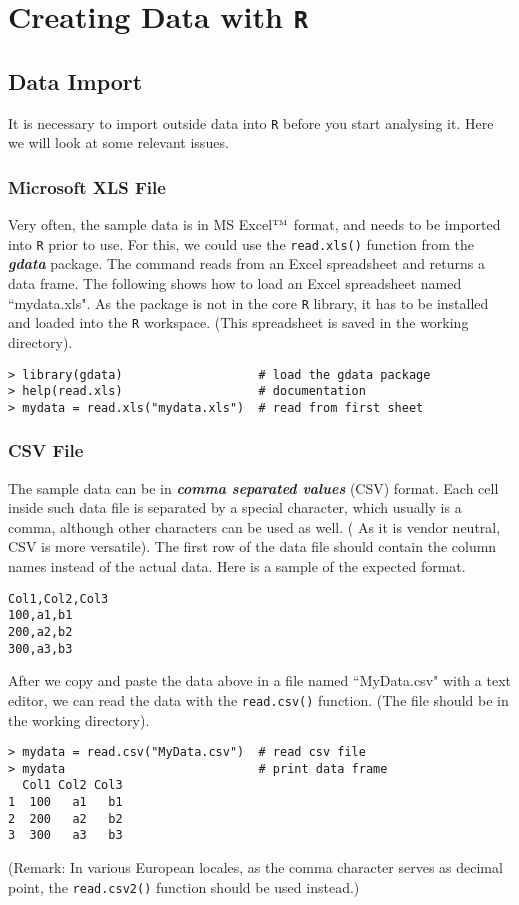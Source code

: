 \documentclass[a4paper,12pt]{article}
\begin{document}
\section{Creating Data with \texttt{R}}

\subsection{Data Import}
It is necessary to import outside data into \texttt{R} before you start analysing it. Here we will look at some relevant issues.

\subsubsection{Microsoft XLS File}
Very often, the sample data is in MS Excel$^{\mbox{\tiny{TM}}}$ format, and needs to be imported into \texttt{R} prior to use. For this, we could use the \texttt{read.xls()} function from the \textbf{\textit{gdata}} package. The command reads from an Excel spreadsheet and returns a data frame. The following shows how to load an Excel spreadsheet named ``mydata.xls". As the package is not in the core \texttt{R} library, it has to be installed and loaded into the \texttt{R} workspace. (This spreadsheet is saved in the working directory).
\begin{verbatim}
> library(gdata)                   # load the gdata package
> help(read.xls)                   # documentation
> mydata = read.xls("mydata.xls")  # read from first sheet
\end{verbatim}


\subsubsection{CSV File}
The sample data can be in \textit{\textbf{comma separated values}} (CSV) format. Each cell inside such data file is separated by a special character, which usually is a comma, although other characters can be used as well. ( As it is vendor neutral, CSV is more versatile).
The first row of the data file should contain the column names instead of the actual data. Here is a sample of the expected format.
\begin{verbatim}
Col1,Col2,Col3
100,a1,b1
200,a2,b2
300,a3,b3
\end{verbatim}

After we copy and paste the data above in a file named ``MyData.csv" with a text editor, we can read the data with the \texttt{read.csv()} function. (The file should be in the working directory).
\begin{verbatim}
> mydata = read.csv("MyData.csv")  # read csv file
> mydata                           # print data frame
  Col1 Col2 Col3
1  100   a1   b1
2  200   a2   b2
3  300   a3   b3
\end{verbatim}
(Remark: In various European locales, as the comma character serves as decimal point, the \texttt{read.csv2()} function should be used instead.)
\end{document}
